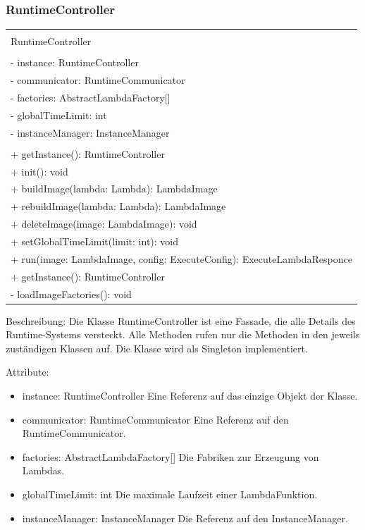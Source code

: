 \documentclass[a4paper,20pt,oneside]{book}
\begin{document}
	\subsubsection{RuntimeController}
	\centering
	\begin{tabular}{|l|}
	\hline \\
	RuntimeController \\
	\hline \\
	- instance: RuntimeController \\
	- communicator: RuntimeCommunicator \\
	- factories: AbstractLambdaFactory[] \\
	- globalTimeLimit: int \\
	- instanceManager: InstanceManager \\
	\hline \\
	+ getInstance(): RuntimeController \\
	+ init(): void \\
	+ buildImage(lambda: Lambda): LambdaImage \\
	+ rebuildImage(lambda: Lambda): LambdaImage \\
	+ deleteImage(image: LambdaImage): void \\
	+ setGlobalTimeLimit(limit: int): void \\
	+ run(image: LambdaImage, config: ExecuteConfig): ExecuteLambdaResponce \\
	+ getInstance(): RuntimeController \\
	- loadImageFactories(): void \\
	\hline
	\end{tabular}		
	
	\raggedright
	\vspace{0.5cm}	
	
	Beschreibung:
	\linebreak Die Klasse RuntimeController ist eine Fassade, die alle Details des Runtime-Systems versteckt. Alle Methoden rufen nur die Methoden in den jeweils zuständigen Klassen auf. Die Klasse wird als Singleton implementiert. 
	\vspace{0.5cm}	
	
	Attribute:
	\begin{itemize}
	\item instance: RuntimeController
	\linebreak Eine Referenz auf das einzige Objekt der Klasse.
	\item communicator: RuntimeCommunicator
	\linebreak Eine Referenz auf den RuntimeCommunicator.
	\item factories: AbstractLambdaFactory[]
	\linebreak Die Fabriken zur Erzeugung von Lambdas.
	\item globalTimeLimit: int
	\linebreak Die maximale Laufzeit einer LambdaFunktion.
	\item instanceManager: InstanceManager
	\linebreak Die Referenz auf den InstanceManager.
	\end{itemize}
	
\end{document}
